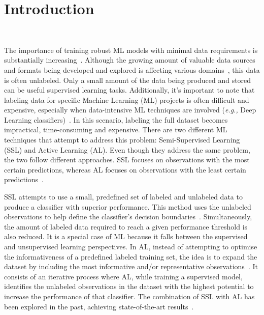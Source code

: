 \documentclass[preprint, 12pt]{elsarticle}
\begin{document}
\linenumbers%

\section{Introduction}~\label{sec:introduction}


The importance of training robust ML models with minimal data requirements is
substantially increasing~\cite{Nath2021, Sverchkov2017, Li2012}. Although the
growing amount of valuable data sources and formats being developed and
explored is affecting various domains~\cite{Li2021}, this data is often
unlabeled. Only a small amount of the data being produced and stored can be
useful supervised learning tasks. Additionally, it's important to note that
labeling data for specific Machine Learning (ML) projects is often difficult
and expensive, especially when data-intensive ML techniques are involved
(\textit{e.g.,} Deep Learning classifiers)~\cite{Nath2021}. In this scenario,
labeling the full dataset becomes impractical, time-consuming and expensive.
There are two different ML techniques that attempt to address this problem:
Semi-Supervised Learning (SSL) and Active Learning (AL). Even though they
address the same problem, the two follow different approaches. SSL focuses on
observations with the most certain predictions, whereas AL focuses on
observations with the least certain predictions~\cite{Simeoni2020}.

SSL attempts to use a small, predefined set of labeled and unlabeled data to
produce a classifier with superior performance. This method uses the unlabeled
observations to help define the classifier's decision
boundaries~\cite{Van2020}. Simultaneously, the amount of labeled data required
to reach a given performance threshold is also reduced. It is a special case
of ML because it falls between the supervised and unsupervised learning
perspectives. In AL, instead of attempting to optimise the informativeness of
a predefined labeled training set, the idea is to expand the dataset by
including the most informative and/or representative
observations~\cite{Sener2018}. It consists of an iterative process where AL,
while training a supervised model, identifies the unlabeled observations in
the dataset with the highest potential to increase the performance of that
classifier. The combination of SSL with AL has been explored in the past,
achieving state-of-the-art results~\cite{Leng2013}.
 
\end{document}
